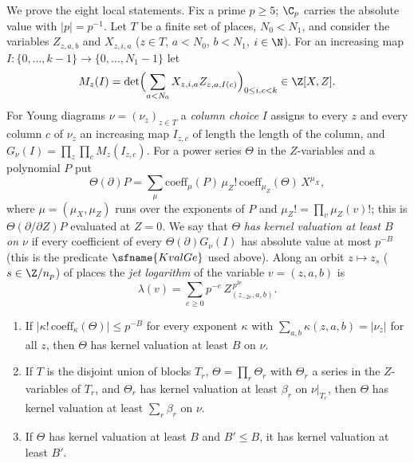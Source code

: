We prove the eight local statements. Fix a prime $p\ge5$; $\C_p$ carries the absolute value with $|p|=p^{-1}$. Let
$T$ be a finite set of places, $N_0<N_1$, and consider the variables $Z_{z,a,b}$ and $X_{z,i,a}$ ($z\in T$, $a<N_0$,
$b<N_1$, $i\in\N$). For an increasing map $I\colon\{0,\dots,k-1\}\to\{0,\dots,N_1-1\}$ let
\[
M_z(I)=\det\Bigl(\sum_{a<N_0}X_{z,i,a}Z_{z,a,I(c)}\Bigr)_{0\le i,c<k}\in\Z[X,Z].
\]
For Young diagrams $\nu=(\nu_z)_{z\in T}$ a \emph{column choice} $I$ assigns to every $z$ and every column $c$ of
$\nu_z$ an increasing map $I_{z,c}$ of length the length of the column, and $G_\nu(I)=\prod_z\prod_cM_z(I_{z,c})$. For a
power series $\Theta$ in the $Z$-variables and a polynomial $P$ put
\[
\Theta(\partial)P=\sum_\mu\mathrm{coeff}_\mu(P)\,\mu_Z!\,\mathrm{coeff}_{\mu_Z}(\Theta)\,X^{\mu_X},
\]
where $\mu=(\mu_X,\mu_Z)$ runs over the exponents of $P$ and $\mu_Z!=\prod_v\mu_Z(v)!$; this is $\Theta(\partial/\partial Z)P$
evaluated at $Z=0$. We say that $\Theta$ \emph{has kernel valuation at least $B$ on $\nu$} if every coefficient of every
$\Theta(\partial)G_\nu(I)$ has absolute value at most $p^{-B}$ (this is the predicate $\sfname{KvalGe}$ used above).
Along an orbit $z\mapsto z_s$ ($s\in\Z/n_p$) of places the \emph{jet logarithm} of the variable $v=(z,a,b)$ is
\[
\lambda(v)=\sum_{e\ge0}p^{-e}\,Z_{(z_{-2e},a,b)}^{\,p^{2e}} .
\]

\begin{lemma}\label{pf:top-shape:kvalbasic}
\begin{enumerate}[label=(\alph*)]
\item If $|\kappa!\,\mathrm{coeff}_\kappa(\Theta)|\le p^{-B}$ for every exponent $\kappa$ with $\sum_{a,b}\kappa(z,a,b)=|\nu_z|$
for all $z$, then $\Theta$ has kernel valuation at least $B$ on $\nu$.
\item If $T$ is the disjoint union of blocks $T_r$, $\Theta=\prod_r\Theta_r$ with $\Theta_r$ a series in the $Z$-variables of
$T_r$, and $\Theta_r$ has kernel valuation at least $\beta_r$ on $\nu|_{T_r}$, then $\Theta$ has kernel valuation at least
$\sum_r\beta_r$ on $\nu$.
\item If $\Theta$ has kernel valuation at least $B$ and $B'\le B$, it has kernel valuation at least $B'$.
\end{enumerate}
\end{lemma}


